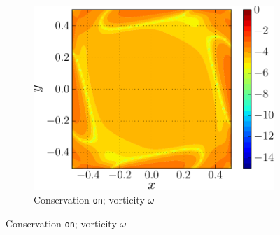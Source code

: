 \begin{figure}[!p]
\begin{subfigure}[t]{0.45\textwidth}
             \includegraphics[width=\linewidth]{./figures/hybrid/lambOseent2/lambOseen_fully_wErrorFinal_compressed-crop.pdf}
             \caption{Conservation \texttt{on}; vorticity $\omega$}
             \label{fig:lambOseen_fullyCon_wErrorFinal}
     \end{subfigure}%
            

\end{figure}
